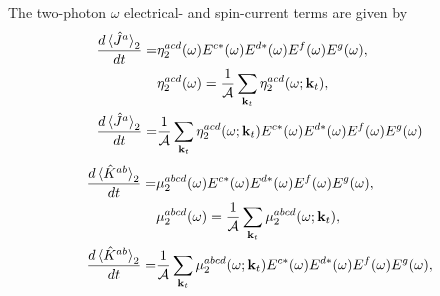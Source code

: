 \documentclass{article}
\newcommand{\kt}{\mathbf{k}_{t}}
\begin{document}
The two-photon $\omega$  electrical- and spin-current terms are given by
\begin{align}
\frac{d\ev*{\hat{J}^{a}}_{2}}{dt} =& \eta^{acd}_{2}(\omega) E^{c*}(\omega)
E^{d*}(\omega) E^{f}(\omega) E^{g}(\omega), \nonumber \\ 
& \eta^{acd}_{2}(\omega) = \frac{1}{\mathcal{A}} \sum_{\kt} \eta^{acd}_{2}
(\omega;\kt), \nonumber \\
\frac{d\ev*{\hat{J}^{a}}_{2}}{dt} =& \frac{1}{\mathcal{A}} \sum_{\kt} 
\eta^{acd}_{2} (\omega;\kt) E^{c*}(\omega) E^{d*}(\omega) E^{f}(\omega) 
E^{g}(\omega)\label{eq:J_2-1w}
\end{align}
\begin{align}
\frac{d\ev*{\hat{K}^{ab}}_{2}}{dt} =& \mu^{abcd}_{2}(\omega)
E^{c*}(\omega) E^{d*}(\omega) E^{f}(\omega) E^{g}(\omega), \nonumber \\ 
& \mu^{abcd}_{2}(\omega) = \frac{1}{\mathcal{A}} \sum_{\kt} \mu^{abcd}_{2}
(\omega;\kt) , \nonumber \\
\frac{d\ev*{\hat{K}^{ab}}_{2}}{dt} =& \frac{1}{\mathcal{A}} \sum_{\kt} 
\mu^{abcd}_{2}(\omega;\kt) E^{c*}(\omega) E^{d*}(\omega) E^{f}(\omega) 
E^{g}(\omega), \label{eq:K_2-1w}
\end{align}
\end{document}
